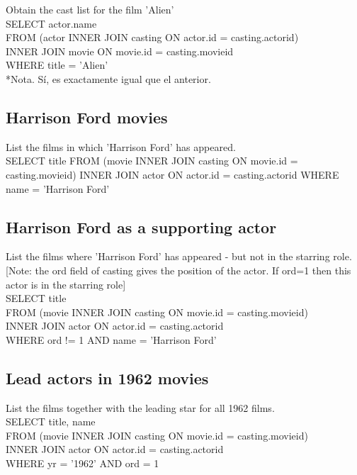 \documentclass[10pt, oneside]{article}
\begin{document}
Obtain the cast list for the film 'Alien'\\

SELECT actor.name\\
FROM (actor INNER JOIN casting ON actor.id = casting.actorid)\\
INNER JOIN movie ON movie.id = casting.movieid\\
WHERE title = 'Alien'\\

*Nota. Sí, es exactamente igual que el anterior.

\subsection{Harrison Ford movies}

List the films in which 'Harrison Ford' has appeared.\\

SELECT title 
FROM (movie INNER JOIN casting ON movie.id = casting.movieid) 
INNER JOIN actor ON actor.id = casting.actorid 
WHERE name = 'Harrison Ford'

\subsection{Harrison Ford as a supporting actor}

List the films where 'Harrison Ford' has appeared - but not in the starring role. [Note: the ord field of casting gives the position of the actor. If ord=1 then this actor is in the starring role]\\

SELECT title\\
FROM (movie INNER JOIN casting ON movie.id = casting.movieid)\\ 
INNER JOIN actor ON actor.id = casting.actorid\\
WHERE ord != 1 AND name = 'Harrison Ford'\\

\subsection{Lead actors in 1962 movies}

List the films together with the leading star for all 1962 films.\\

SELECT title, name\\
FROM (movie INNER JOIN casting ON movie.id = casting.movieid) \\
INNER JOIN actor ON actor.id = casting.actorid\\
WHERE yr = '1962' AND ord = 1\\
\end{document}
